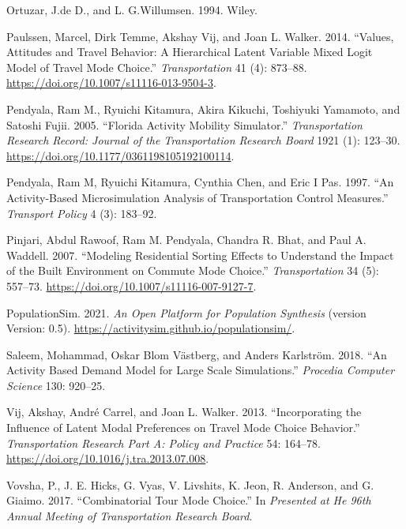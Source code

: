 \documentclass[12pt, oneside, openright]{byuthesis}
\newlength{\cslhangindent}
\newlength{\cslentryspacingunit} %
\newenvironment{CSLReferences}[2] %
 {%
  \setlength{\parindent}{0pt}
  \ifodd #1
  \let\oldpar\par
  \def\par{\hangindent=\cslhangindent\oldpar}
  \fi
  \setlength{\parskip}{#2\cslentryspacingunit}
 }%
 {}
\begin{document}
\begin{CSLReferences}{1}{0}
\leavevmode{}%
Ortuzar, J.de D., and L. G.Willumsen. 1994. Wiley.

\leavevmode{}%
Paulssen, Marcel, Dirk Temme, Akshay Vij, and Joan L. Walker. 2014. {``Values, Attitudes and Travel Behavior: A Hierarchical Latent Variable Mixed Logit Model of Travel Mode Choice.''} \emph{Transportation} 41 (4): 873--88. \url{https://doi.org/10.1007/s11116-013-9504-3}.

\leavevmode{}%
Pendyala, Ram M., Ryuichi Kitamura, Akira Kikuchi, Toshiyuki Yamamoto, and Satoshi Fujii. 2005. {``Florida Activity Mobility Simulator.''} \emph{Transportation Research Record: Journal of the Transportation Research Board} 1921 (1): 123--30. \url{https://doi.org/10.1177/0361198105192100114}.

\leavevmode{}%
Pendyala, Ram M, Ryuichi Kitamura, Cynthia Chen, and Eric I Pas. 1997. {``An Activity-Based Microsimulation Analysis of Transportation Control Measures.''} \emph{Transport Policy} 4 (3): 183--92.

\leavevmode{}%
Pinjari, Abdul Rawoof, Ram M. Pendyala, Chandra R. Bhat, and Paul A. Waddell. 2007. {``Modeling Residential Sorting Effects to Understand the Impact of the Built Environment on Commute Mode Choice.''} \emph{Transportation} 34 (5): 557--73. \url{https://doi.org/10.1007/s11116-007-9127-7}.

\leavevmode{}%
PopulationSim. 2021. \emph{An Open Platform for Population Synthesis} (version Version: 0.5). \url{https://activitysim.github.io/populationsim/}.

\leavevmode{}%
Saleem, Mohammad, Oskar Blom Västberg, and Anders Karlström. 2018. {``An Activity Based Demand Model for Large Scale Simulations.''} \emph{Procedia Computer Science} 130: 920--25.

\leavevmode{}%
Vij, Akshay, André Carrel, and Joan L. Walker. 2013. {``Incorporating the Influence of Latent Modal Preferences on Travel Mode Choice Behavior.''} \emph{Transportation Research Part A: Policy and Practice} 54: 164--78. \url{https://doi.org/10.1016/j.tra.2013.07.008}.

\leavevmode{}%
Vovsha, P., J. E. Hicks, G. Vyas, V. Livshits, K. Jeon, R. Anderson, and G. Giaimo. 2017. {``Combinatorial Tour Mode Choice.''} In \emph{Presented at He 96th Annual Meeting of Transportation Research Board}.


\end{CSLReferences}
\end{document}
